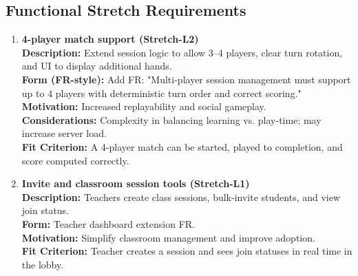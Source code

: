 \documentclass[12pt]{article}
\begin{document}
\subsection{Functional Stretch Requirements}
\begin{enumerate}
  
  \item \textbf{4-player match support (Stretch-L2)}\\
  \textbf{Description:} Extend session logic to allow 3--4 players, clear turn rotation, and UI to display additional hands.\\
  \textbf{Form (FR-style):} Add FR: "Multi-player session management must support up to 4 players with deterministic turn order and correct scoring."\\
  \textbf{Motivation:} Increased replayability and social gameplay.\\
  \textbf{Considerations:} Complexity in balancing learning vs. play-time; may increase server load.\\
  \textbf{Fit Criterion:} A 4-player match can be started, played to completion, and score computed correctly.
  
  \item \textbf{Invite and classroom session tools (Stretch-L1)}\\
  \textbf{Description:} Teachers create class sessions, bulk-invite students, and view join status.\\
  \textbf{Form:} Teacher dashboard extension FR.\\
  \textbf{Motivation:} Simplify classroom management and improve adoption.\\
  \textbf{Fit Criterion:} Teacher creates a session and sees join statuses in real time in the lobby.
\end{enumerate}
\end{document}
